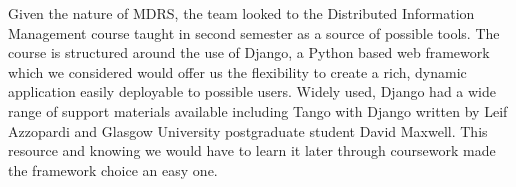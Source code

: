 \documentclass{l3proj}
\begin{document}


Given the nature of MDRS, the team looked to the Distributed Information Management course taught in second semester as a source of possible tools. The course is structured around the use of Django, a Python based web framework which we considered  would offer us the flexibility to create a rich, dynamic application easily deployable to possible users. Widely used, Django had a wide range of support materials available including Tango with Django written by Leif Azzopardi and Glasgow University postgraduate student David Maxwell. This resource and knowing we would have to learn it later through coursework made the framework choice an easy one.
\end{document}
